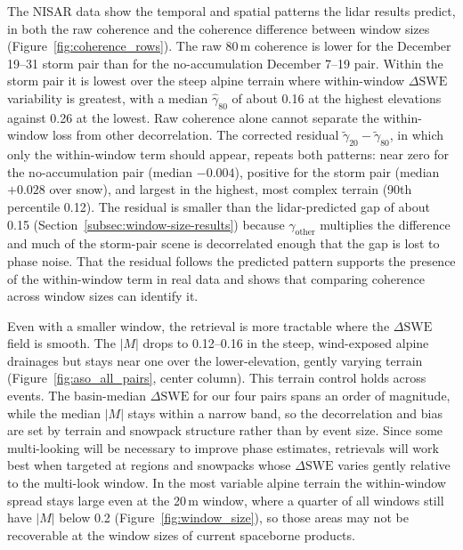 \documentclass[tc, manuscript]{copernicus}
\begin{document}
The NISAR data show the temporal and spatial patterns the lidar results predict, in both the raw coherence and the coherence difference between window sizes (Figure~\ref{fig:coherence_rows}). The raw 80\,\unit{m} coherence is lower for the December 19--31 storm pair than for the no-accumulation December 7--19 pair. Within the storm pair it is lowest over the steep alpine terrain where within-window $\Delta\mathrm{SWE}$ variability is greatest, with a median $\hat{\gamma}_{80}$ of about 0.16 at the highest elevations against 0.26 at the lowest. Raw coherence alone cannot separate the within-window loss from other decorrelation. The corrected residual $\tilde{\gamma}_{20}-\tilde{\gamma}_{80}$, in which only the within-window term should appear, repeats both patterns: near zero for the no-accumulation pair (median $-0.004$), positive for the storm pair (median $+0.028$ over snow), and largest in the highest, most complex terrain (90th percentile 0.12). The residual is smaller than the lidar-predicted gap of about 0.15 (Section~\ref{subsec:window-size-results}) because $\gamma_\mathrm{other}$ multiplies the difference and much of the storm-pair scene is decorrelated enough that the gap is lost to phase noise. That the residual follows the predicted pattern supports the presence of the within-window term in real data and shows that comparing coherence across window sizes can identify it.

Even with a smaller window, the retrieval is more tractable where the $\Delta\mathrm{SWE}$ field is smooth. The $|M|$ drops to 0.12--0.16 in the steep, wind-exposed alpine drainages but stays near one over the lower-elevation, gently varying terrain (Figure~\ref{fig:aso_all_pairs}, center column). This terrain control holds across events. The basin-median $\Delta\mathrm{SWE}$ for our four pairs spans an order of magnitude, while the median $|M|$ stays within a narrow band, so the decorrelation and bias are set by terrain and snowpack structure rather than by event size. Since some multi-looking will be necessary to improve phase estimates, retrievals will work best when targeted at regions and snowpacks whose $\Delta\mathrm{SWE}$ varies gently relative to the multi-look window. In the most variable alpine terrain the within-window spread stays large even at the 20\,\unit{m} window, where a quarter of all windows still have $|M|$ below 0.2 (Figure~\ref{fig:window_size}), so those areas may not be recoverable at the window sizes of current spaceborne products.
\end{document}
